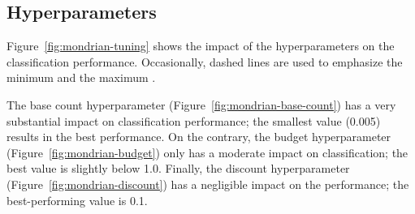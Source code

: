 \subsection{\mondrianforest Hyperparameters}

Figure~\ref{fig:mondrian-tuning} shows the impact of the \mondrianforest hyperparameters on
the classification performance. Occasionally, dashed lines are used to
emphasize the minimum and the maximum .

The base count hyperparameter (Figure~\ref{fig:mondrian-base-count}) has a
very substantial impact on classification performance; the smallest value
(0.005) results in the best performance. On the contrary, the
budget hyperparameter (Figure~\ref{fig:mondrian-budget}) only has a
moderate impact on classification; the best value is slightly below
1.0. Finally, the discount hyperparameter
(Figure~\ref{fig:mondrian-discount}) has a negligible impact on the
performance; the best-performing value is 0.1.

